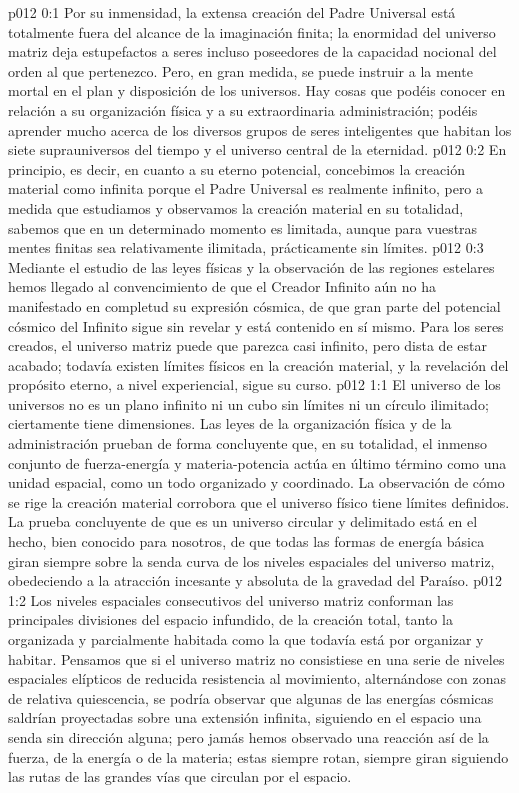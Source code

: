 \author{Perfeccionador de la sabiduría}
\vs p012 0:1 Por su inmensidad, la extensa creación del Padre Universal está totalmente fuera del alcance de la imaginación finita; la enormidad del universo matriz deja estupefactos a seres incluso poseedores de la capacidad nocional del orden al que pertenezco. Pero, en gran medida, se puede instruir a la mente mortal en el plan y disposición de los universos. Hay cosas que podéis conocer en relación a su organización física y a su extraordinaria administración; podéis aprender mucho acerca de los diversos grupos de seres inteligentes que habitan los siete suprauniversos del tiempo y el universo central de la eternidad.
\vs p012 0:2 En principio, es decir, en cuanto a su eterno potencial, concebimos la creación material como infinita porque el Padre Universal es realmente infinito, pero a medida que estudiamos y observamos la creación material en su totalidad, sabemos que en un determinado momento es limitada, aunque para vuestras mentes finitas sea relativamente ilimitada, prácticamente sin límites.
\vs p012 0:3 Mediante el estudio de las leyes físicas y la observación de las regiones estelares hemos llegado al convencimiento de que el Creador Infinito aún no ha manifestado en completud su expresión cósmica, de que gran parte del potencial cósmico del Infinito sigue sin revelar y está contenido en sí mismo. Para los seres creados, el universo matriz puede que parezca casi infinito, pero dista de estar acabado; todavía existen límites físicos en la creación material, y la revelación del propósito eterno, a nivel experiencial, sigue su curso.
\vs p012 1:1 El universo de los universos no es un plano infinito ni un cubo sin límites ni un círculo ilimitado; ciertamente tiene dimensiones. Las leyes de la organización física y de la administración prueban de forma concluyente que, en su totalidad, el inmenso conjunto de fuerza\hyp{}energía y materia\hyp{}potencia actúa en último término como una unidad espacial, como un todo organizado y coordinado. La observación de cómo se rige la creación material corrobora que el universo físico tiene límites definidos. La prueba concluyente de que es un universo circular y delimitado está en el hecho, bien conocido para nosotros, de que todas las formas de energía básica giran siempre sobre la senda curva de los niveles espaciales del universo matriz, obedeciendo a la atracción incesante y absoluta de la gravedad del Paraíso.
\vs p012 1:2 Los niveles espaciales consecutivos del universo matriz conforman las principales divisiones del espacio infundido, de la creación total, tanto la organizada y parcialmente habitada como la que todavía está por organizar y habitar. Pensamos que si el universo matriz no consistiese en una serie de niveles espaciales elípticos de reducida resistencia al movimiento, alternándose con zonas de relativa quiescencia, se podría observar que algunas de las energías cósmicas saldrían proyectadas sobre una extensión infinita, siguiendo en el espacio una senda sin dirección alguna; pero jamás hemos observado una reacción así de la fuerza, de la energía o de la materia; estas siempre rotan, siempre giran siguiendo las rutas de las grandes vías que circulan por el espacio.
